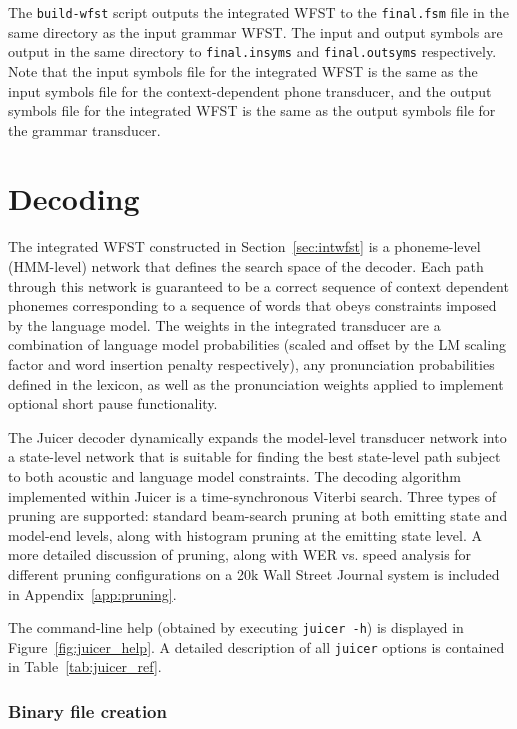 \documentclass[a4paper,12pt]{report}
\begin{document}
The {\tt build-wfst} script outputs the integrated WFST to the {\tt final.fsm} file in the same directory as the input grammar WFST. The input and output symbols are output in the same directory to {\tt final.insyms} and {\tt final.outsyms} respectively. Note that the input symbols file for the integrated WFST is the same as the input symbols file for the context-dependent phone transducer, and the output symbols file for the integrated WFST is the same as the output symbols file for the grammar transducer.

\section{Decoding}

The integrated WFST constructed in Section~\ref{sec:intwfst} is a phoneme-level (HMM-level) network that defines the search space of the decoder. Each path through this network is guaranteed to be a correct sequence of context dependent phonemes corresponding to a sequence of words that obeys constraints imposed by the language model. The weights in the integrated transducer are a combination of language model probabilities (scaled and offset by the LM scaling factor and word insertion penalty respectively), any pronunciation probabilities defined in the lexicon, as well as the pronunciation weights applied to implement optional short pause functionality.

The Juicer decoder dynamically expands the model-level transducer network into a state-level network that is suitable for finding the best state-level path subject to both acoustic and language model constraints. The decoding algorithm implemented within Juicer is a time-synchronous Viterbi search. Three types of pruning are supported: standard beam-search pruning at both emitting state and model-end levels, along with histogram pruning at the emitting state level. A more detailed discussion of pruning, along with WER vs. speed analysis for different pruning configurations on a 20k Wall Street Journal system is included in Appendix~\ref{app:pruning}.

The command-line help (obtained by executing {\tt juicer -h}) is displayed in Figure~\ref{fig:juicer_help}. A detailed description of all {\tt juicer} options is contained in Table~\ref{tab:juicer_ref}.

\subsubsection{Binary file creation}
\end{document}
